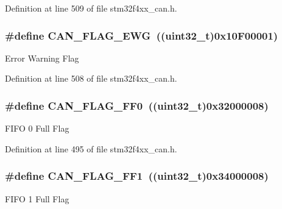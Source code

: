 Definition at line 509 of file stm32f4xx\-\_\-can.\-h.

\hypertarget{group___c_a_n__flags_gae8906ba9c4031866c5096418ffa9bf71}{
\subsubsection[{C\-A\-N\-\_\-\-F\-L\-A\-G\-\_\-\-E\-W\-G}]{\setlength{\rightskip}{0pt plus 5cm}\#define C\-A\-N\-\_\-\-F\-L\-A\-G\-\_\-\-E\-W\-G~((uint32\-\_\-t)0x10\-F00001)}}\label{group___c_a_n__flags_gae8906ba9c4031866c5096418ffa9bf71}
Error Warning Flag 

Definition at line 508 of file stm32f4xx\-\_\-can.\-h.

\hypertarget{group___c_a_n__flags_ga11648741ff43af1561ce7009698fb797}{
\subsubsection[{C\-A\-N\-\_\-\-F\-L\-A\-G\-\_\-\-F\-F0}]{\setlength{\rightskip}{0pt plus 5cm}\#define C\-A\-N\-\_\-\-F\-L\-A\-G\-\_\-\-F\-F0~((uint32\-\_\-t)0x32000008)}}\label{group___c_a_n__flags_ga11648741ff43af1561ce7009698fb797}
F\-I\-F\-O 0 Full Flag 

Definition at line 495 of file stm32f4xx\-\_\-can.\-h.

\hypertarget{group___c_a_n__flags_ga0fa967743c5db04189bb2160aa48e371}{
\subsubsection[{C\-A\-N\-\_\-\-F\-L\-A\-G\-\_\-\-F\-F1}]{\setlength{\rightskip}{0pt plus 5cm}\#define C\-A\-N\-\_\-\-F\-L\-A\-G\-\_\-\-F\-F1~((uint32\-\_\-t)0x34000008)}}\label{group___c_a_n__flags_ga0fa967743c5db04189bb2160aa48e371}
F\-I\-F\-O 1 Full Flag 

